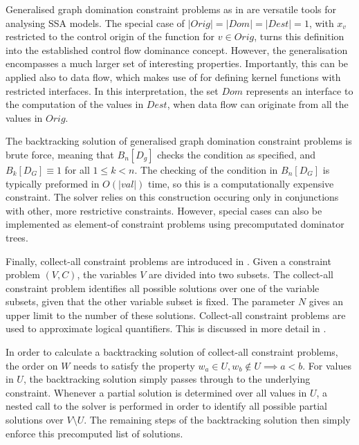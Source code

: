     Generalised graph domination constraint problems as in 
    are versatile tools for analysing SSA models.
    The special case of $|Orig|=|Dom|=|Dest|=1$, with $x_v$ restricted to the
    control origin of the function for $v\in Orig$, turns this definition
    into the established control flow dominance concept.
    However, the generalisation encompasses a much larger set of interesting
    properties.
    Importantly, this can be applied also to data flow, which
     makes use of for defining kernel functions with
    restricted interfaces.
    In this interpretation, the set $Dom$ represents an interface to the
    computation of the values in $Dest$, when data flow can originate from all
    the values in $Orig$.

    The backtracking solution of generalised graph domination constraint
    problems is brute force, meaning that $B_n[D_g]$ checks the condition
    as specified, and $B_k[D_G]\equiv 1$ for all $1\leq k<n$.
    The checking of the condition in $B_n[D_G]$ is typically preformed in
    $O(|val|)$ time, so this is a computationally expensive constraint.
    The solver relies on this construction occuring only in conjunctions with
    other, more restrictive constraints.
    However, special cases can also be implemented as element-of constraint
    problems using precomputated dominator trees.

    Finally, collect-all constraint problems are introduced in
    .
    Given a constraint problem $(V,C)$, the variables $V$ are divided into
    two subsets.
    The collect-all constraint problem identifies all possible solutions over
    one of the variable subsets, given that the other variable subset is fixed.
    The parameter $N$ gives an upper limit to the number of these solutions.
    Collect-all constraint problems are used to approximate logical quantifiers.
    This is discussed in more detail in .

    In order to calculate a backtracking solution of collect-all constraint
    problems, the order on $W$ needs to satisfy the property
    $w_a\in U,w_b\notin U\implies a<b$.
    For values in $U$, the backtracking solution simply passes through to the
    underlying constraint.
    Whenever a partial solution is determined over all values in $U$, a nested
    call to the solver is performed in order to identify all possible partial
    solutions over $V\setminus U$.
    The remaining steps of the backtracking solution then simply enforce this
    precomputed list of solutions.


